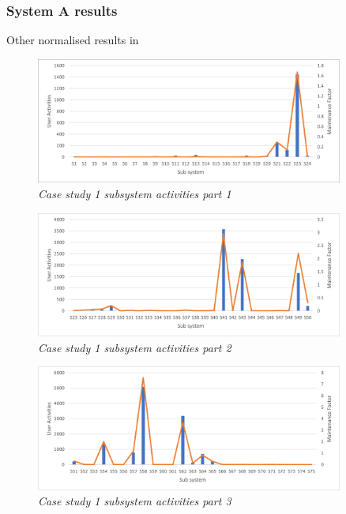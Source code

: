 \subsubsection{System A results}
Other normalised results in 

\begin{figure}[!htb]
	\centering %
	\includegraphics[width=0.9\textwidth]{img/ch3/uat/systemA/s1_s24.png}
	\caption[Case study 1 subsystem activities part 1]
	{\textit{Case study 1 subsystem activities part 1}}\label{fig:ch3_saS1S24}
\end{figure} 

\begin{figure}[!htb]
	\centering %
	\includegraphics[width=0.9\textwidth]{img/ch3/uat/systemA/s25_s50.png}
	\caption[Case study 1 subsystem activities part 2]
	{\textit{Case study 1 subsystem activities part 2}}\label{fig:ch3_saS25S50}
\end{figure} 

\begin{figure}[!htb]
	\centering %
	\includegraphics[width=0.9\textwidth]{img/ch3/uat/systemA/s51_s75.png}
	\caption[Case study 1 subsystem activities part 3]
	{\textit{Case study 1 subsystem activities part 3}}\label{fig:ch3_saS51S75}
\end{figure} 


